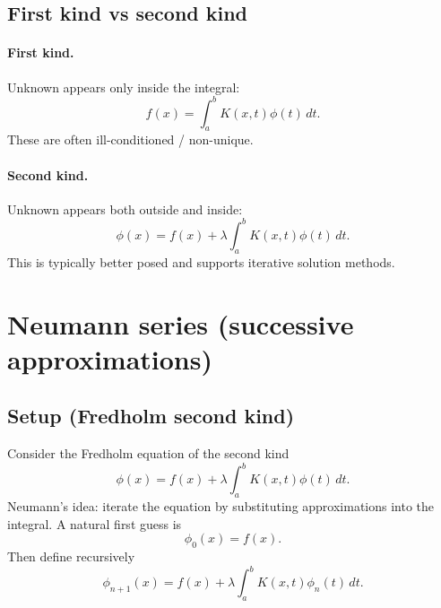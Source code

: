 \subsection{First kind vs second kind}
\paragraph{First kind.}
Unknown appears only inside the integral:
\begin{equation}
f(x) = \int_a^b K(x,t)\phi(t)\,dt.
\end{equation}
These are often ill-conditioned / non-unique.

\paragraph{Second kind.}
Unknown appears both outside and inside:
\begin{equation}
\phi(x) = f(x) + \lambda \int_a^b K(x,t)\phi(t)\,dt.
\end{equation}
This is typically better posed and supports iterative solution methods.


\section{Neumann series (successive approximations)}

\subsection{Setup (Fredholm second kind)}
Consider the Fredholm equation of the second kind
\begin{equation}
\phi(x) = f(x) + \lambda \int_a^b K(x,t)\phi(t)\,dt.
\end{equation}
Neumann's idea: iterate the equation by substituting approximations into the integral.
A natural first guess is
\begin{equation}
\phi_0(x) = f(x).
\end{equation}
Then define recursively
\begin{equation}
\phi_{n+1}(x) = f(x) + \lambda \int_a^b K(x,t)\phi_n(t)\,dt.
\end{equation}

